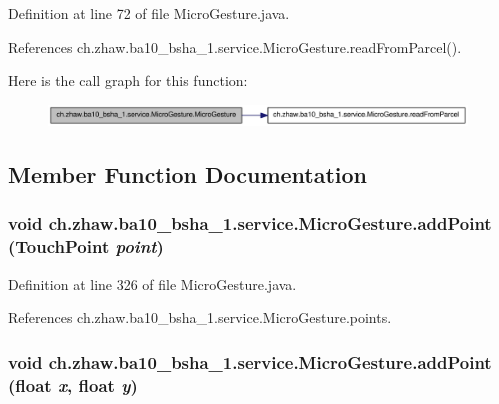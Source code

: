Definition at line 72 of file MicroGesture.java.

References ch.zhaw.ba10\_\-bsha\_\-1.service.MicroGesture.readFromParcel().

Here is the call graph for this function:\nopagebreak
\begin{figure}[H]
\begin{center}
\leavevmode
\includegraphics[width=315pt]{classch_1_1zhaw_1_1ba10__bsha__1_1_1service_1_1MicroGesture_a915edd1a693527b48678802234a9d37d_cgraph}
\end{center}
\end{figure}


\subsection{Member Function Documentation}
\hypertarget{classch_1_1zhaw_1_1ba10__bsha__1_1_1service_1_1MicroGesture_a3a553d36d664db7199804f09f08d28cf}{
\subsubsection[{addPoint}]{\setlength{\rightskip}{0pt plus 5cm}void ch.zhaw.ba10\_\-bsha\_\-1.service.MicroGesture.addPoint ({\bf TouchPoint} {\em point})}}
\label{classch_1_1zhaw_1_1ba10__bsha__1_1_1service_1_1MicroGesture_a3a553d36d664db7199804f09f08d28cf}


Definition at line 326 of file MicroGesture.java.

References ch.zhaw.ba10\_\-bsha\_\-1.service.MicroGesture.points.\hypertarget{classch_1_1zhaw_1_1ba10__bsha__1_1_1service_1_1MicroGesture_a328c48ead9f14d52e747a54a970fdd9e}{
\subsubsection[{addPoint}]{\setlength{\rightskip}{0pt plus 5cm}void ch.zhaw.ba10\_\-bsha\_\-1.service.MicroGesture.addPoint (float {\em x}, \/  float {\em y})}}
\label{classch_1_1zhaw_1_1ba10__bsha__1_1_1service_1_1MicroGesture_a328c48ead9f14d52e747a54a970fdd9e}



